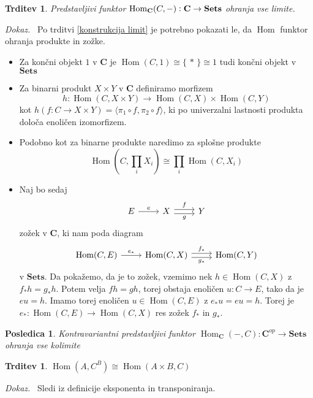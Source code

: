 \documentclass[12pt,a4paper]{book}
\theoremstyle{definition}
\theoremstyle{plain}
\newtheorem{trditev}[definicija]{Trditev}
\newtheorem{posledica}{Posledica}[definicija]
\newenvironment{dokaz}{\emph{Dokaz.}\ }{\hspace{\fill}{$\Box$}}
\theoremstyle{definition}
\theoremstyle{remark}
\newcommand{\cat}[1]{\textbf{#1}}
\DeclareMathOperator{\Hom}{Hom}
\renewcommand{\set}[1]{\{\,#1\,\}}
\begin{document}
 
\begin{trditev} Predstavljivi funktor $\Hom_{\bf{C}}(C,-): \bf{C} \to \bf{Sets}$ ohranja vse limite.
\end{trditev}
\begin{dokaz}
Po trditvi \ref{konstrukcija limit} je potrebno pokazati le, da $\Hom$ funktor ohranja produkte in zožke. 

\begin{itemize}
\item Za končni objekt $1$ v $\cat{C}$ je $\Hom(C,1) \cong \set{*} \cong 1$ tudi končni objekt v $\cat{Sets}$
\item Za binarni produkt $X \times Y$ v $\cat{C}$ definiramo morfizem 
$$h : \Hom(C, X \times Y) \to \Hom(C,X) \times \Hom(C,Y)$$
kot $h(f : C \to X \times Y) = \langle \pi_1 \circ f, \pi_2 \circ f \rangle$, ki po univerzalni lastnosti produkta določa enoličen izomorfizem.
\item Podobno kot za binarne produkte naredimo za splošne produkte
$$\Hom(C, \prod_i X_i) \cong \prod_i \Hom(C, X_i)$$
\item Naj bo sedaj
$$ \begin{tikzcd}[sep=normal]
E \ar[r, "e"] & X \ar[r, shift left, "f"] \ar[r, shift right, "g"'] & Y
\end{tikzcd} $$
zožek v $\cat{C}$, ki nam poda diagram
$$ \begin{tikzcd}[sep=normal]
\Hom(C,E) \ar[r, "e_*"] & \Hom(C,X) \ar[r, shift left, "f_*"] \ar[r, shift right, "g_*"'] & \Hom(C,Y)
\end{tikzcd} $$
v $\cat{Sets}$. Da pokažemo, da je to zožek, vzemimo nek $h \in \Hom(C,X)$ z $f_* h = g_* h$. Potem velja $fh = gh$, torej obstaja enoličen $u : C \to E$, tako da je $eu = h$. Imamo torej enoličen $u \in \Hom(C,E)$ z $e_* u = eu = h$. Torej je $e_* : \Hom(C,E) \to \Hom(C,X)$ res zožek $f_*$ in $g_*$.
\end{itemize}

\end{dokaz}

\begin{posledica}
Kontravariantni predstavljivi funktor $\Hom_\cat{C}(-,C) : \cat{C}^{op} \to \cat{Sets}$ ohranja vse kolimite
\end{posledica}

\begin{trditev}
$\Hom(A, C^B) \cong \Hom(A \times B, C)$
\end{trditev}
\begin{dokaz}
Sledi iz definicije eksponenta in transponiranja.
\end{dokaz}
\end{document}
